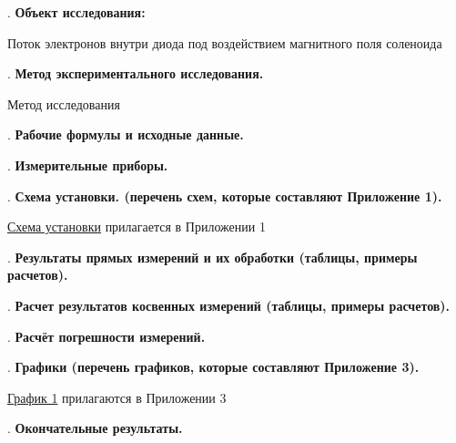\documentclass[12pt]{article}
\newcommand{\placeholder}[1]{{\color{magenta}#1}}
\begin{document}
    \mediumvspace

    . \textbf{Объект исследования: } 
    
    Поток электронов внутри диода под воздействием магнитного поля соленоида

    \mediumvspace

    . \textbf{Метод экспериментального исследования.}

    \placeholder{Метод исследования}

    \mediumvspace

    . \textbf{Рабочие формулы и исходные данные.}

    

    \mediumvspace

    . \textbf{Измерительные приборы.}

    \smallvspace

    

    \mediumvspace

    . \textbf{Схема установки. (перечень схем, которые составляют Приложение 1).}

    \hyperlink{schema1}{Схема установки} прилагается в Приложении 1

    \mediumvspace

    . \textbf{Результаты прямых измерений и их обработки (таблицы, примеры расчетов).}

    

    \mediumvspace

    . \textbf{Расчет результатов косвенных измерений (таблицы, примеры расчетов).}

    

    \mediumvspace

    . \textbf{Расчёт погрешности измерений.}

    \mediumvspace

    . \textbf{Графики (перечень графиков, которые составляют Приложение 3).}

    \hyperlink{diagram1}{График 1} прилагаются в Приложении 3

    \mediumvspace

    . \textbf{Окончательные результаты.}

    

    \mediumvspace
\end{document}
